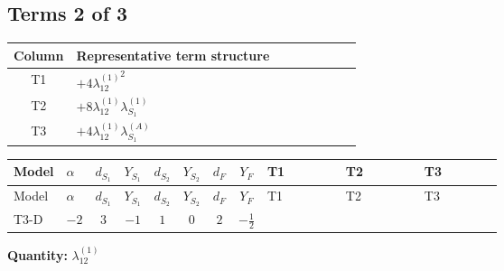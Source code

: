 \documentclass[8pt]{article}
\begin{document}
\begin{landscape}
\subsection*{Terms 2 of 3}
\begin{center}
\begin{tabular}{@{}c >{\raggedright\arraybackslash}p{0.82\linewidth}@{}}
\toprule
Column & Representative term structure \\
\midrule
T1 & \(\displaystyle +4 {\lambda_{12}^{(1)}}^2\) \\
\midrule
T2 & \(\displaystyle +8 {\lambda_{12}^{(1)}} {\lambda_{S_1}^{(1)}}\) \\
\midrule
T3 & \(\displaystyle +4 {\lambda_{12}^{(1)}} {\lambda_{S_1}^{(A)}}\) \\
\midrule
\bottomrule
\end{tabular}
\end{center}
\smallskip
\tiny
\begin{longtable}{@{}llcccccc >{\raggedright\arraybackslash}p{0.21\linewidth} >{\raggedright\arraybackslash}p{0.21\linewidth} >{\raggedright\arraybackslash}p{0.21\linewidth}@{}}
\toprule
Model & $\alpha$ & $d_{S_1}$ & $Y_{S_1}$ & $d_{S_2}$ & $Y_{S_2}$ & $d_F$ & $Y_F$ & T1 & T2 & T3 \\
\midrule
\endfirsthead
\toprule
Model & $\alpha$ & $d_{S_1}$ & $Y_{S_1}$ & $d_{S_2}$ & $Y_{S_2}$ & $d_F$ & $Y_F$ & T1 & T2 & T3 \\
\midrule
\endhead
T3-D & $-2$ & $3$ & $-1$ & $1$ & $0$ & $2$ & $-\frac{1}{2}$ & \scriptsize\adjustbox{max width=\linewidth}{$\begin{gathered} +4 {\lambda_{12}^{(1)}}^2\end{gathered}$} & \scriptsize\adjustbox{max width=\linewidth}{$\begin{gathered} +8 {\lambda_{12}^{(1)}} {\lambda_{S_1}^{(1)}}\end{gathered}$} & \scriptsize\adjustbox{max width=\linewidth}{$\begin{gathered} +4 {\lambda_{12}^{(1)}} {\lambda_{S_1}^{(A)}}\end{gathered}$} \\
\midrule
\bottomrule
\end{longtable}
\clearpage
\noindent\textbf{Quantity: }$\lambda_{12}^{(1)}$\par\smallskip

\end{landscape}
\end{document}
